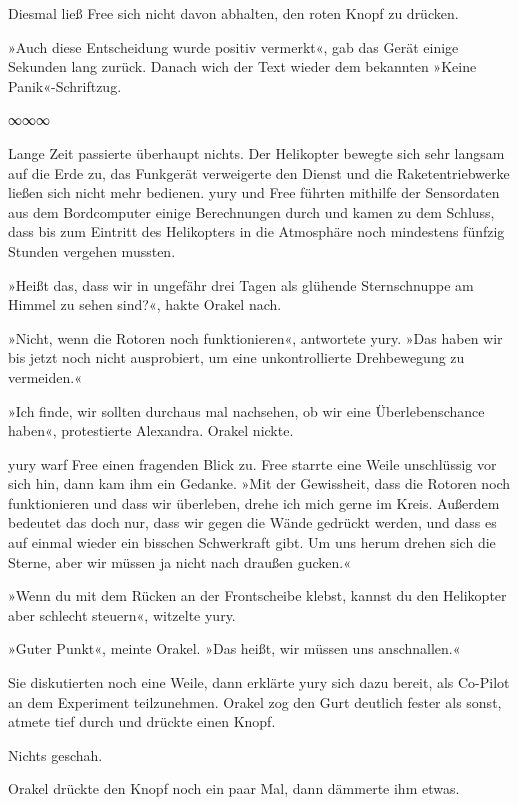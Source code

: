 Diesmal ließ Free sich nicht davon abhalten, den roten Knopf zu drücken.

»Auch diese Entscheidung wurde positiv vermerkt«, gab das Gerät einige Sekunden lang zurück. Danach wich der Text wieder dem bekannten »Keine Panik«-Schriftzug.

\begin{center}
	∞∞∞
\end{center}

Lange Zeit passierte überhaupt nichts. Der Helikopter bewegte sich sehr langsam auf die Erde zu, das Funkgerät verweigerte den Dienst und die Raketentriebwerke ließen sich nicht mehr bedienen. yury und Free führten mithilfe der Sensordaten aus dem Bordcomputer einige Berechnungen durch und kamen zu dem Schluss, dass bis zum Eintritt des Helikopters in die Atmosphäre noch mindestens fünfzig Stunden vergehen mussten.

»Heißt das, dass wir in ungefähr drei Tagen als glühende Sternschnuppe am Himmel zu sehen sind?«, hakte Orakel nach.

»Nicht, wenn die Rotoren noch funktionieren«, antwortete yury. »Das haben wir bis jetzt noch nicht ausprobiert, um eine unkontrollierte Drehbewegung zu vermeiden.«

»Ich finde, wir sollten durchaus mal nachsehen, ob wir eine Überlebenschance haben«, protestierte Alexandra. Orakel nickte.

yury warf Free einen fragenden Blick zu. Free starrte eine Weile unschlüssig vor sich hin, dann kam ihm ein Gedanke. »Mit der Gewissheit, dass die Rotoren noch funktionieren und dass wir überleben, drehe ich mich gerne im Kreis. Außerdem bedeutet das doch nur, dass wir gegen die Wände gedrückt werden, und dass es auf einmal wieder ein bisschen Schwerkraft gibt. Um uns herum drehen sich die Sterne, aber wir müssen ja nicht nach draußen gucken.«

»Wenn du mit dem Rücken an der Frontscheibe klebst, kannst du den Helikopter aber schlecht steuern«, witzelte yury.

»Guter Punkt«, meinte Orakel. »Das heißt, wir müssen uns anschnallen.«

Sie diskutierten noch eine Weile, dann erklärte yury sich dazu bereit, als Co-Pilot an dem Experiment teilzunehmen. Orakel zog den Gurt deutlich fester als sonst, atmete tief durch und drückte einen Knopf.

Nichts geschah.

Orakel drückte den Knopf noch ein paar Mal, dann dämmerte ihm etwas.

